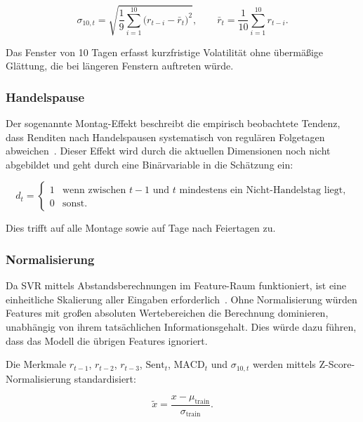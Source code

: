 \begin{equation}
    \sigma_{10,t} = \sqrt{\frac{1}{9} \sum_{i=1}^{10} \bigl(r_{t-i} - \bar{r}_t\bigr)^2},
    \qquad \bar{r}_t = \frac{1}{10}\sum_{i=1}^{10} r_{t-i}.
\end{equation}

Das Fenster von 10 Tagen erfasst kurzfristige Volatilität ohne übermäßige Glättung, die bei längeren Fenstern auftreten würde.

\subsubsection{Handelspause}

Der sogenannte Montag-Effekt beschreibt die empirisch beobachtete Tendenz, dass Renditen nach Handelspausen systematisch von regulären Folgetagen abweichen~\cite{french1980}. Dieser Effekt wird durch die aktuellen Dimensionen noch nicht abgebildet und geht durch eine Binärvariable in die Schätzung ein:

\begin{equation}
    d_t = \begin{cases} 1 & \text{wenn zwischen } t-1 \text{ und } t \text{ mindestens ein Nicht-Handelstag liegt,} \\ 0 & \text{sonst.} \end{cases}
\end{equation}

Dies trifft auf alle Montage sowie auf Tage nach Feiertagen zu.

\subsubsection{Normalisierung}

Da \ac{SVR} mittels Abstandsberechnungen im Feature-Raum funktioniert, ist eine einheitliche Skalierung aller Eingaben erforderlich~\cite{scholkopf2002}. Ohne Normalisierung würden Features mit großen absoluten Wertebereichen die Berechnung dominieren, unabhängig von ihrem tatsächlichen Informationsgehalt. Dies würde dazu führen, dass das Modell die übrigen Features ignoriert.

Die Merkmale $r_{t-1}$, $r_{t-2}$, $r_{t-3}$, $\text{Sent}_t$, $\text{MACD}_t$ und $\sigma_{10,t}$ werden mittels Z-Score-Normalisierung standardisiert:

\begin{equation}
    \tilde{x} = \frac{x - \mu_{\text{train}}}{\sigma_{\text{train}}}.
\end{equation}


